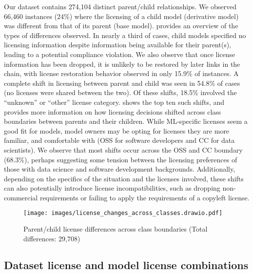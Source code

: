 Our dataset contains 274,104 distinct parent/child relationships.  We observed 66,460 instances (24\%) where the licensing of a child model (\ie derivative model) was different from that of its parent (\ie base model).  provides an overview of the types of differences observed. In nearly a third of cases, child models specified no licensing information despite information being available for their parent(s), leading to a potential compliance violation. We also observe that once license information has been dropped, it is unlikely to be restored by later links in the chain, with license restoration behavior observed in only 15.9\% of instances.  A complete shift in licensing between parent and child was seen in 54.8\% of cases (\ie no licenses were shared between the two).  Of these shifts, 18.5\% involved the ``unknown'' or ``other'' license category.   shows the top ten such shifts, and  provides more information on how licensing decisions shifted across class boundaries between parents and their children. %
While ML-specific licenses seem a good fit for models, model owners may be opting for licenses they are more familiar, and comfortable with (OSS for software developers and CC for data scientists). We observe that most shifts occur across the OSS and CC boundary (68.3\%), perhaps suggesting some tension between the licensing preferences of those with data science and software development backgrounds. Additionally, depending on the specifics of the situation and the licenses involved, these shifts can also potentially introduce license incompatibilities, such as dropping non-commercial requirements or failing to apply the requirements of a copyleft license. 


\begin{figure}[t]
\centering
\texttt{[image: images/license\_changes\_across\_classes.drawio.pdf]}
\caption{Parent/child license differences across class boundaries (Total differences: 29,708)}%
\label{fig:changes_across_classes}
\end{figure}

\subsection{Dataset license and model license combinations} 



